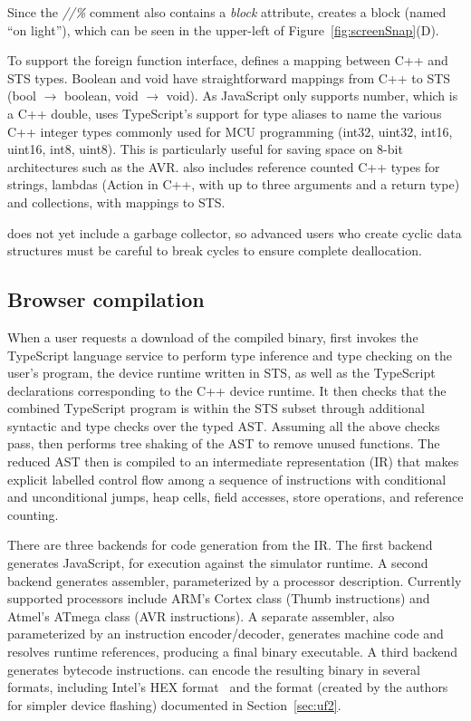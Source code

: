 Since the \emph{//\%} comment also contains a \emph{block} attribute, \MC creates a block (named ``on light''), which can be seen in the upper-left of Figure~\ref{fig:screenSnap}(D).

To support the foreign function interface, \MC defines a mapping between C++ and STS types.
Boolean and void have straightforward mappings from C++ to STS (bool $\rightarrow$ boolean, void $\rightarrow$ void).
As JavaScript only supports number, which is a C++ double, \MC uses TypeScript's support
for type aliases to name the various C++ integer types commonly used for MCU programming
(int32, uint32, int16, uint16, int8, uint8).
This is particularly useful for saving space on 8-bit architectures such as the AVR.
\MC also includes reference counted C++ types for strings, lambdas (Action in C++, with
up to three arguments and a return type) and collections, with mappings to STS.

\MC does not yet include a garbage collector, so advanced users who create cyclic
data structures must be careful to break cycles to ensure complete deallocation.

\subsection{Browser compilation}

When a user requests a download of the compiled binary, \MC first invokes the TypeScript language service to perform type inference and type checking on the
user's program, the device runtime written in STS, as well as the TypeScript declarations
corresponding to the C++ device runtime. It then checks that the
combined TypeScript program is within the STS subset through additional syntactic and type checks over the typed AST.  Assuming all the
above checks pass, \MC then performs tree shaking of the AST to remove unused functions.
The reduced AST then is compiled to an intermediate representation (IR) that makes explicit labelled control
flow among a sequence of instructions with conditional and unconditional jumps, heap cells, field accesses, store operations, and reference counting.

There are three backends for code generation from the IR. The first backend generates JavaScript, for execution against the simulator runtime.  A second backend generates assembler, parameterized by a processor description.  Currently supported processors include ARM's Cortex class (Thumb instructions) and Atmel's ATmega class (AVR instructions). A separate assembler, also parameterized by an instruction encoder/decoder, generates machine code and resolves runtime references, producing a final binary executable. A third backend generates bytecode instructions. \MC can encode the resulting binary in several formats, including Intel's HEX format~\cite{IntelHEX} and the \UF format (created by the authors for simpler device flashing) documented in Section~\ref{sec:uf2}.

